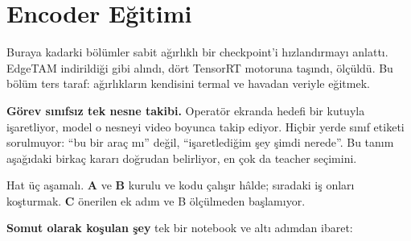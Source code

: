 \chapter{Encoder Eğitimi}
\label{ch:egitim}

Buraya kadarki bölümler sabit ağırlıklı bir checkpoint'i hızlandırmayı
anlattı. EdgeTAM indirildiği gibi alındı, dört TensorRT motoruna taşındı,
ölçüldü. Bu bölüm ters taraf: ağırlıkların kendisini termal ve havadan
veriyle eğitmek.

\textbf{Görev sınıfsız tek nesne takibi.} Operatör ekranda hedefi bir kutuyla
işaretliyor, model o nesneyi video boyunca takip ediyor. Hiçbir yerde sınıf
etiketi sorulmuyor: ``bu bir araç mı'' değil, ``işaretlediğim şey şimdi
nerede''. Bu tanım aşağıdaki birkaç kararı doğrudan belirliyor, en çok da
teacher seçimini.

Hat üç aşamalı. \textbf{A} ve \textbf{B} kurulu ve kodu çalışır hâlde;
sıradaki iş onları koşturmak. \textbf{C} önerilen ek adım ve B ölçülmeden
başlamıyor.

\textbf{Somut olarak koşulan şey} tek bir notebook ve altı adımdan ibaret:

